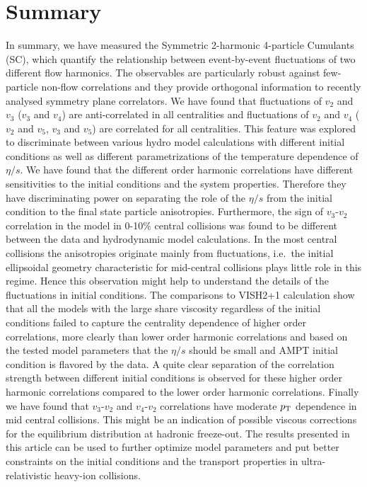 \documentclass[ALICE,manyauthors]{cernphprep}
\begin{document}
\section{Summary}
\label{sec:summary}
In summary, we have measured the Symmetric 2-harmonic 4-particle Cumulants (SC), which quantify the relationship between event-by-event fluctuations of two different flow harmonics. The observables are particularly robust against few-particle non-flow correlations and they provide orthogonal information to recently analysed symmetry plane correlators. We have found that fluctuations of $v_2$ and $v_3$ ($v_3$ and $v_4$) are anti-correlated in all centralities and fluctuations of $v_2$ and $v_4$ ( $v_2$ and $v_5$, $v_3$ and $v_5$) are correlated for all centralities. 
This feature was explored to discriminate between various hydro model calculations with different initial conditions as well as different parametrizations of the temperature dependence of $\eta/s$.
We have found that the different order harmonic correlations have different sensitivities to the initial conditions and the system properties. Therefore they have discriminating power on separating the role of the $\eta/s$  from the initial condition to the final state particle anisotropies.
Furthermore, the sign of $v_3$-$v_2$ correlation in the model in 0-10\% central collisions was found to be different between the data and hydrodynamic model calculations.
In the most central collisions the anisotropies originate mainly from fluctuations, i.e.\ the initial ellipsoidal geometry characteristic for mid-central collisions plays little role in this regime. Hence this observation might help to understand the details of the fluctuations in initial conditions. 
The comparisons to VISH2+1 calculation show that all the models with the large share viscosity regardless of the initial conditions failed to capture the centrality dependence of higher order correlations, more clearly than lower order harmonic correlations and based on the tested model parameters that the $\eta/s$ should be small and AMPT initial condition is flavored by the data. A quite clear separation of the correlation strength between different initial conditions is observed for these higher order harmonic correlations compared to the lower order harmonic correlations.
Finally we have found that $v_3$-$v_2$ and $v_4$-$v_2$ correlations have moderate $p_{\textnormal{T}}{}$ dependence in mid central collisions. This might be an indication of possible viscous corrections for the equilibrium distribution at hadronic freeze-out.
The results presented in this article can be used to further optimize model parameters and put better constraints on the initial conditions and the transport properties in ultra-relativistic heavy-ion collisions.
\end{document}
